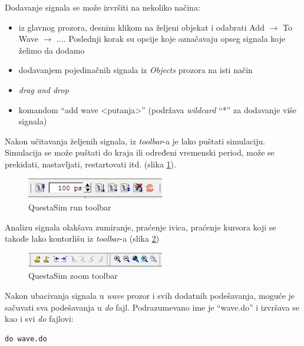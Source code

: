 Dodavanje signala se može izvršiti na nekoliko načina:
\begin{itemize}
\item iz glavnog prozora, desnim klikom na željeni objekat i odabrati Add
  \(\rightarrow\) To Wave \(\rightarrow\) .... Poslednji korak su opcije koje
  označavaju opseg signala koje želimo da dodamo
\item dodavanjem pojedinačnih signala iz \emph{Objects} prozora na isti način
\item \emph{drag and drop}
\item komandom ``add wave \textless putanja\textgreater'' (podržava
  \emph{wildcard} ``*'' za dodavanje više signala)
\end{itemize}

Nakon učitavanja željenih signala, iz \emph{toolbar}-a je lako puštati
simulaciju.
Simulacija se može puštati do kraja ili određeni vremenski period, može se
prekidati, nastavljati, restartovati itd. (slika \ref{fig:questa_toolbar_run}).\\

\begin{figure}[h!]
  \center
  \includegraphics[width=60mm, scale=0.5]{img/v1_toolbar_run.png}
  \caption{QuestaSim run toolbar}
  \label{fig:questa_toolbar_run}
\end{figure}

Analizu signala olakšava zumiranje, praćenje ivica, praćenje kursora koji se
takođe lako kontorlišu iz \emph{toolbar}-a (slika
\ref{fig:questa_toolbar_zoom})\\

\begin{figure}[h!]
  \center
  \includegraphics[width=60mm, scale=0.5]{img/v1_toolbar_zoom.png}
  \caption{QuestaSim zoom toolbar}
  \label{fig:questa_toolbar_zoom}
\end{figure}

Nakon ubacivanja signala u \emph{wave} prozor i svih dodatnih podešavanja,
moguće je sačuvati sva podešavanja u \emph{do} fajl.
Podrazumevano ime je ``wave.do'' i izvršava se kao i svi \emph{do} fajlovi:

\begin{lstlisting}[language=Python]
do wave.do 
\end{lstlisting}

